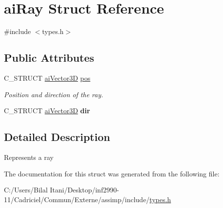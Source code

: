 \hypertarget{structai_ray}{}\section{ai\+Ray Struct Reference}
\label{structai_ray}


{\ttfamily \#include $<$types.\+h$>$}

\subsection*{Public Attributes}
\begin{DoxyCompactItemize}
\item 
C\+\_\+\+S\+T\+R\+U\+CT \hyperlink{structai_vector3_d}{ai\+Vector3D} \hyperlink{structai_ray_a312f663a7d2580b1b3beb52ffd4ab4c9}{pos}\hypertarget{structai_ray_a312f663a7d2580b1b3beb52ffd4ab4c9}{}\label{structai_ray_a312f663a7d2580b1b3beb52ffd4ab4c9}

\begin{DoxyCompactList}\small\item\em Position and direction of the ray. \end{DoxyCompactList}\item 
C\+\_\+\+S\+T\+R\+U\+CT \hyperlink{structai_vector3_d}{ai\+Vector3D} {\bfseries dir}\hypertarget{structai_ray_a635d9120af2654716e5e7952d837282b}{}\label{structai_ray_a635d9120af2654716e5e7952d837282b}

\end{DoxyCompactItemize}


\subsection{Detailed Description}
Represents a ray 

The documentation for this struct was generated from the following file\+:\begin{DoxyCompactItemize}
\item 
C\+:/\+Users/\+Bilal Itani/\+Desktop/inf2990-\/11/\+Cadriciel/\+Commun/\+Externe/assimp/include/\hyperlink{types_8h}{types.\+h}\end{DoxyCompactItemize}
